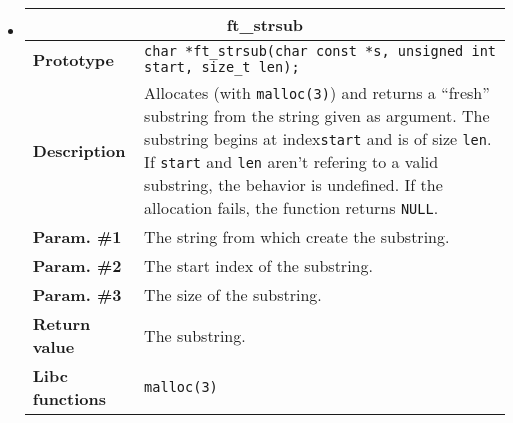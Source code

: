 \documentclass{42-en}
\begin{document}
\begin{itemize}
            \item \begin{tabular}{|l|p{11cm}|}
                \hline
                \multicolumn{2}{|c|}{\textbf{ft\_strsub}}\\
                \hline
                \textbf{Prototype} & \texttt{char
                  *\hspace{5mm}ft\_strsub(char const *s, unsigned int
                  start, size\_t len);}\\
                \hline
                \textbf{Description} & Allocates (with
                \texttt{malloc(3)}) and returns a ``fresh'' substring
                from the string given as argument. The substring
                begins at index\texttt{start} and is of size \texttt{len}.
                If \texttt{start} and \texttt{len} aren't refering to a
                valid substring, the behavior is undefined. If the
                allocation fails, the function returns \texttt{NULL}.\\
                \hline
                \textbf{Param. \#1} & The string from which create
                the substring.\\
                \hline
                \textbf{Param. \#2} & The start index of the
                substring.\\
                \hline
                \textbf{Param. \#3} & The size of the substring.\\
                \hline
                \textbf{Return value} & The substring.\\
                \hline
                \textbf{Libc functions} & \texttt{malloc(3)}\\
                \hline
            \end{tabular}


\end{itemize}
\end{document}
